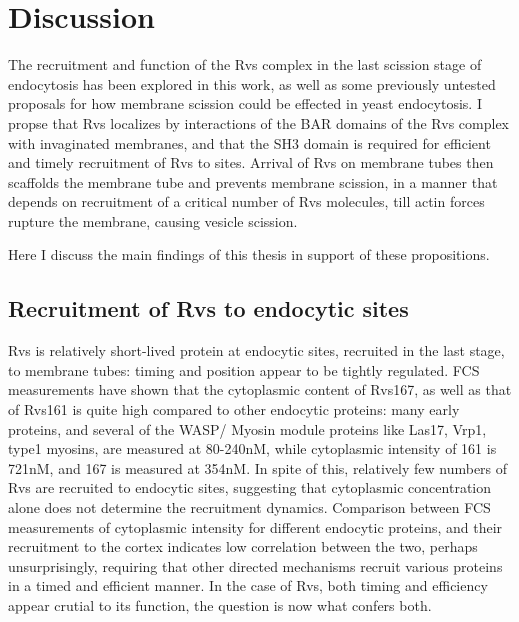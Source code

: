 
\chapter{Discussion}    
\label{Ch:discussion}
The recruitment and function of the Rvs complex in the last scission stage of endocytosis has been explored in this work, as well as some previously untested proposals for how membrane scission could be effected in yeast endocytosis. 
I propse that Rvs localizes by interactions of the BAR domains of the Rvs complex with invaginated membranes, and that the SH3 domain is required for efficient and timely recruitment of Rvs to sites. Arrival of Rvs on membrane tubes then scaffolds the membrane tube and prevents membrane scission, in a manner that depends on recruitment of a critical number of Rvs molecules, till actin forces rupture the membrane, causing vesicle scission. 

Here I discuss the main findings of this thesis in support of these propositions.

\section{Recruitment of Rvs to endocytic sites}
Rvs is relatively short-lived protein at endocytic sites, recruited in the last stage, to membrane tubes: timing and position appear to be tightly regulated. FCS measurements have shown that the cytoplasmic content of Rvs167, as well as that of Rvs161 is quite high compared to other endocytic proteins: many early proteins, and several of the WASP/ Myosin module proteins like Las17, Vrp1, type1 myosins, are measured at 80-240nM, while cytoplasmic intensity of 161 is 721nM, and 167 is measured at 354nM. In spite of this, relatively few numbers of Rvs are recruited to endocytic sites, suggesting that cytoplasmic concentration alone does not determine the recruitment dynamics. Comparison between FCS measurements of cytoplasmic intensity for different endocytic proteins, and their recruitment to the cortex indicates low correlation between the two, perhaps unsurprisingly, requiring that other directed mechanisms recruit various proteins in a timed and efficient manner. In the case of Rvs, both timing and efficiency appear crutial to its function, the question is now what confers both.  


